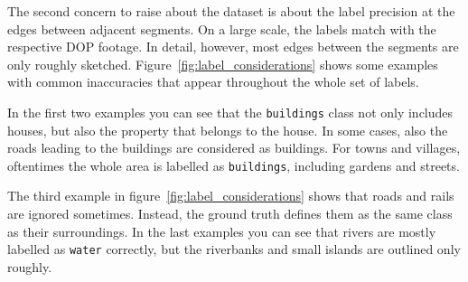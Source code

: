 The second concern to raise about the dataset is about the label precision at the edges between adjacent segments. On a large scale, the labels match with the respective DOP footage. In detail, however, most edges between the segments are only roughly sketched. Figure~\ref{fig:label_considerations} shows some examples with common inaccuracies that appear throughout the whole set of labels.

In the first two examples you can see that the \texttt{buildings} class not only includes houses, but also the property that belongs to the house. In some cases, also the roads leading to the buildings are considered as buildings. For towns and villages, oftentimes the whole area is labelled as \texttt{buildings}, including gardens and streets.

The third example in figure~\ref{fig:label_considerations} shows that roads and rails are ignored sometimes. Instead, the ground truth defines them as the same class as their surroundings. In the last examples you can see that rivers are mostly labelled as \texttt{water} correctly, but the riverbanks and small islands are outlined only roughly.

